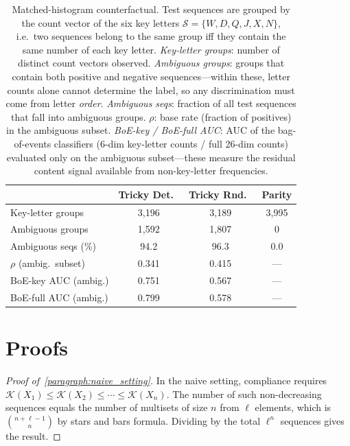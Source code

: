 \documentclass{article}
\theoremstyle{plain}
\theoremstyle{definition}
\theoremstyle{remark}
\begin{document}
\begin{table}[h!]
\centering
\small
\caption{Matched-histogram counterfactual. Test sequences are grouped by the count vector of the six key letters $\mathcal{S}=\{W,D,Q,J,X,N\}$, i.e.\ two sequences belong to the same group iff they contain the same number of each key letter.
\emph{Key-letter groups}: number of distinct count vectors observed.
\emph{Ambiguous groups}: groups that contain both positive and negative sequences---within these, letter counts alone cannot determine the label, so any discrimination must come from letter \emph{order}.
\emph{Ambiguous seqs}: fraction of all test sequences that fall into ambiguous groups.
\emph{$\rho$}: base rate (fraction of positives) in the ambiguous subset.
\emph{BoE-key / BoE-full AUC}: AUC of the bag-of-events classifiers (6-dim key-letter counts / full 26-dim counts) evaluated only on the ambiguous subset---these measure the residual content signal available from non-key-letter frequencies.}
\label{tab:matched_histogram}
\begin{tabular}{l c c c}
\toprule
 & Tricky Det.\ & Tricky Rnd.\ & Parity \\
\midrule
Key-letter groups & 3{,}196 & 3{,}189 & 3{,}995 \\
Ambiguous groups & 1{,}592 & 1{,}807 & 0 \\
Ambiguous seqs (\%) & 94.2 & 96.3 & 0.0 \\
$\rho$ (ambig.\ subset) & 0.341 & 0.415 & --- \\
BoE-key AUC (ambig.) & 0.751 & 0.567 & --- \\
BoE-full AUC (ambig.) & 0.799 & 0.578 & --- \\
\bottomrule
\end{tabular}
\end{table}

\newpage

\section{Proofs}
\label{appendix:proof_theorems}

\begin{proof}[Proof of~\ref{paragraph:naive_setting}]
\label{proof:naive_setting}
In the naive setting, compliance requires $\mathcal{K}(X_1) \leq \mathcal{K}(X_2) \leq \cdots \leq \mathcal{K}(X_n)$. The number of such non-decreasing sequences equals the number of multisets of size $n$ from $\ell$ elements, which is $\binom{n+\ell-1}{n}$ by stars and bars formula. Dividing by the total $\ell^n$ sequences gives the result.
\end{proof}
\end{document}
